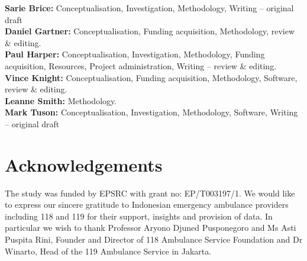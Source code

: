 \documentclass[preprint,12pt]{elsarticle}
\begin{document}
{\bf Sarie Brice:} Conceptualisation, Investigation, Methodology, Writing –
original draft\\

{\bf Daniel Gartner:} Conceptualisation, Funding acquisition, Methodology,
review \& editing.\\

{\bf Paul Harper:} Conceptualisation, Investigation, Methodology, Funding
acquisition, Resources, Project administration, Writing – review \& editing.\\

{\bf Vince Knight:} Conceptualisation, Funding acquisition, Methodology,
Software, review \& editing.\\

{\bf Leanne Smith:} Methodology.\\

{\bf Mark Tuson:} Conceptualisation, Investigation, Methodology, Software,
Writing – original draft\\



\section*{Acknowledgements} The study was funded by EPSRC with grant no:
EP/T003197/1. We would like to express our sincere gratitude to Indonesian
emergency ambulance providers including 118 and 119 for their support, insights
and provision of data. In particular we wish to thank Professor Aryono Djuned
Pusponegoro and Ms Asti Puspita Rini, Founder and Director of 118 Ambulance
Service Foundation and Dr Winarto, Head of the 119 Ambulance Service in Jakarta.



\appendix
\end{document}
